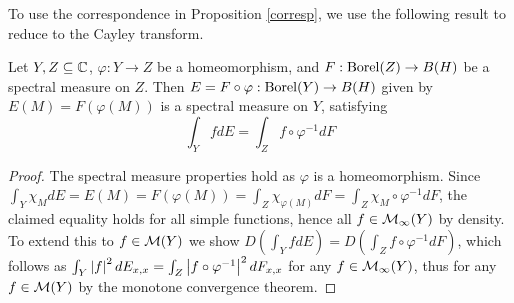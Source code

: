 \documentclass[10pt]{amsart}
\begin{document}
To use the correspondence in Proposition \ref{corresp}, we use the following result to reduce to the Cayley transform.
\begin{lemma}
    Let $Y, Z \subseteq \mathbb{C}$, $\varphi : Y \to Z$ be a homeomorphism, and $F : \operatorname{Borel}(Z) \to B(H)$ be a spectral measure on $Z$. Then $E = F \circ \varphi : \operatorname{Borel}(Y) \to B(H)$ given by $E(M) = F(\varphi(M))$ is a spectral measure on $Y$, satisfying
    $$
        \int_Y fdE = \int_Z f \circ \varphi^{-1}dF
    $$
\end{lemma}
\begin{proof}
    The spectral measure properties hold as $\varphi$ is a homeomorphism. Since $\int_Y \chi_M dE = E(M) = F(\varphi(M)) = \int_Z \chi_{\varphi(M)} dF = \int_Z \chi_M \circ \varphi^{-1} dF$, the claimed equality holds for all simple functions, hence all $f \in \mathcal{M}_\infty(Y)$ by density. To extend this to $f \in \mathcal{M}(Y)$ we show $D(\int_Y f dE) = D(\int_Z f \circ \varphi^{-1} dF)$, which follows as $\int_Y \left| f \right|^2 dE_{x, x} = \int_Z \left| f \circ \varphi^{-1} \right|^2 dF_{x, x}$ for any $f \in \mathcal{M}_\infty(Y)$, thus for any $f \in \mathcal{M}(Y)$ by the monotone convergence theorem.
\end{proof}


\end{document}
